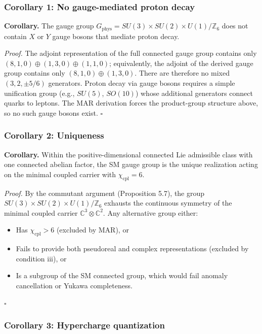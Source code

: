 \subsubsection{Corollary 1: No gauge-mediated proton decay}\label{corollary-1-no-gauge-mediated-proton-decay}

\textbf{Corollary.} The gauge group \(G_{\mathrm{phys}} = SU(3) \times SU(2) \times U(1)/\mathbb{Z}_6\) does not contain \(X\) or \(Y\) gauge bosons that mediate proton decay.

\emph{Proof.} The adjoint representation of the full connected gauge group contains only \((8,1,0)\oplus(1,3,0)\oplus(1,1,0)\); equivalently, the adjoint of the derived gauge group contains only \((8,1,0)\oplus(1,3,0)\). There are therefore no mixed \((3,2,\pm 5/6)\) generators. Proton decay via gauge bosons requires a simple unification group (e.g., \(SU(5)\), \(SO(10)\)) whose additional generators connect quarks to leptons. The MAR derivation forces the product-group structure above, so no such gauge bosons exist. \(\square\)

\subsubsection{Corollary 2: Uniqueness}\label{corollary-2-uniqueness}

\textbf{Corollary.} Within the positive-dimensional connected Lie admissible class with one connected abelian factor, the SM gauge group is the unique realization acting on the minimal coupled carrier with \(\chi_{\mathrm{cpl}} = 6\).

\emph{Proof.} By the commutant argument (Proposition 5.7), the group \(SU(3) \times SU(2) \times U(1)/\mathbb{Z}_6\) exhausts the continuous symmetry of the minimal coupled carrier \(\mathbb{C}^3 \otimes \mathbb{C}^2\). Any alternative group either:

\begin{itemize}
\tightlist
\item
  Has \(\chi_{\mathrm{cpl}} > 6\) (excluded by MAR), or
\item
  Fails to provide both pseudoreal and complex representations (excluded by condition iii), or
\item
  Is a subgroup of the SM connected group, which would fail anomaly cancellation or Yukawa completeness.
\end{itemize}

\(\square\)

\subsubsection{Corollary 3: Hypercharge quantization}\label{corollary-3-hypercharge-quantization}

